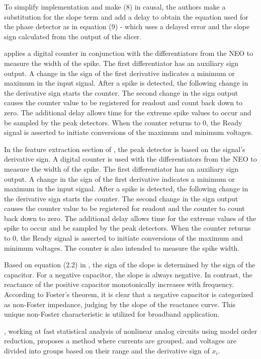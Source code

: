 \documentclass[11pt]{book}
\begin{document}
To simplify implementation and make (8) in \cite{roo2000cmos} causal,
the authors make a substitution for the slope term and add a delay
to obtain the equation used for the phase detector as in equation
(9) - which uses a delayed error and the slope sign calculated from
the output of the slicer.

\cite{holleman2008micro} applies a digital counter in conjunction
with the differentiators from the NEO to measure the width of the
spike. The first differentiator has an auxiliary sign output. A change
in the sign of the first derivative indicates a minimum or maximum
in the input signal. After a spike is detected, the following change
in the derivative sign starts the counter. The second change in the
sign output causes the counter value to be registered for readout
and count back down to zero. The additional delay allows time for
the extreme spike values to occur and be sampled by the peak detectors.
When the counter returns to $0$, the Ready signal is asserted to
initiate conversions of the maximum and minimum voltages. 

In the feature
extraction section of \cite{holleman2011ultra}, the peak detector
is based on the signal's derivative sign. A digital counter is used
with the differentiators from the NEO to measure the width of the
spike. The first differentiator has an auxiliary sign output. A change
in the sign of the first derivative indicates a minimum or maximum
in the input signal. After a spike is detected, the following change
in the derivative sign starts the counter. The second change in the
sign output causes the counter value to be registered for readout
and the counter to count back down to zero. The additional delay allows
time for the extreme values of the spike to occur and be sampled by
the peak detectors. When the counter returns to $0$, the Ready signal
is asserted to initiate conversions of the maximum and minimum voltages.
The counter is also intended to measure the spike width.

Based on equation (2.2) in \cite{long2015non}, the sign of the slope
is determined by the sign of the capacitor. For a negative capacitor,
the slope is always negative. In contrast, the reactance of the positive
capacitor monotonically increases with frequency. According to Foster's
theorem, it is clear that a negative capacitor is categorized as non-Foster
impedance, judging by the slope of the reactance curve. This unique
non-Foster characteristic is utilized for broadband application.

\cite{aridhi2015fast}, working at fast statistical analysis of nonlinear
analog circuits using model order reduction, proposes a method where currents are grouped, and voltages are
divided into groups based on their range and the derivative sign of
$x_{i}$.
\end{document}
